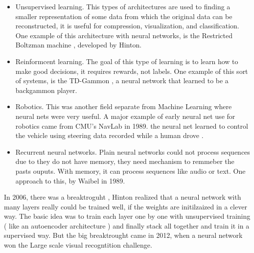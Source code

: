 \documentclass[12pt, a4paper, titlepage,twoside,openright]{article}
\begin{document}
\begin{itemize}

\item Unsupervised learning. This types of architectures are used to finding a smaller representation of some data from which the original data can be reconstructed, it is useful for compression, visualization, and classification. One example of this architecture with neural networks, is the Restricted Boltzman machine \cite{boltzmann}, developed by Hinton.
 
\item Reinformcent learning. The goal of this type of learning is to learn how to make good decisions, it requires rewards, not labels. One example of this sort of systems, is the TD-Gammon \cite{Gammon}, a neural network that learned to be a backgammon player.

\item Robotics. This was another field separate from Machine Learning where neural nets were very useful. A major example of early neural net use for robotics came from CMU's NavLab in 1989. the neural net learned to control the vehicle using steering data recorded while a human drove \cite{alvin}.

\item Recurrent neural networks. Plain neural networks could not process sequences due to they do not have memory, they need mechanism to remmeber the pasts ouputs. With memory, it can process sequences like audio or text. One approach to this, by Waibel \cite{Waibel} in 1989. 


\end{itemize}


In 2006, there was a breaktroguht \cite{hinton06}, Hinton realized that a neural network with many layers really could be trained well, if the weights are initilzaized in a clever way. The basic idea was to train each layer one by one with unsupervised training ( like an autoencoder architecture ) and finally stack all together and train it in a supervised way. But the big breaktrought came in 2012, when a neural network won the Large scale visual recogntition challenge.



\end{document}
